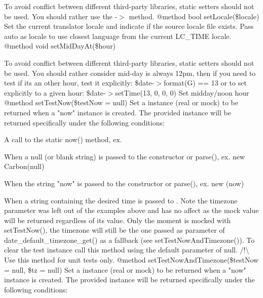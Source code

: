 \begin{DoxyRefList}
To avoid conflict between different third-\/party libraries, static setters should not be used. You should rather use the -\/\texorpdfstring{$>$}{>} method. @method bool set\+Locale(\$locale) Set the current translator locale and indicate if the source locale file exists. Pass \textquotesingle{}auto\textquotesingle{} as locale to use closest language from the current LC\+\_\+\+TIME locale. @method void set\+Mid\+Day\+At(\$hour) 



To avoid conflict between different third-\/party libraries, static setters should not be used. You should rather consider mid-\/day is always 12pm, then if you need to test if it\textquotesingle{}s an other hour, test it explicitly\+: \$date-\/\texorpdfstring{$>$}{>}format(\textquotesingle{}G\textquotesingle{}) == 13 or to set explicitly to a given hour\+: \$date-\/\texorpdfstring{$>$}{>}set\+Time(13, 0, 0, 0) Set midday/noon hour @method  set\+Test\+Now(\$test\+Now = null) Set a  instance (real or mock) to be returned when a "{}now"{} instance is created. The provided instance will be returned specifically under the following conditions\+:
\begin{DoxyItemize}
\item A call to the static now() method, ex. 
\item When a null (or blank string) is passed to the constructor or parse(), ex. new Carbon(null)
\item When the string "{}now"{} is passed to the constructor or parse(), ex. new (\textquotesingle{}now\textquotesingle{})
\item When a string containing the desired time is passed to . Note the timezone parameter was left out of the examples above and has no affect as the mock value will be returned regardless of its value. Only the moment is mocked with set\+Test\+Now(), the timezone will still be the one passed as parameter of date\+\_\+default\+\_\+timezone\+\_\+get() as a fallback (see set\+Test\+Now\+And\+Timezone()). To clear the test instance call this method using the default parameter of null. /!\textbackslash{} Use this method for unit tests only. @method  set\+Test\+Now\+And\+Timezone(\$test\+Now = null, \$tz = null) Set a  instance (real or mock) to be returned when a "{}now"{} instance is created. The provided instance will be returned specifically under the following conditions\+:

\end{DoxyItemize}
\end{DoxyRefList}
